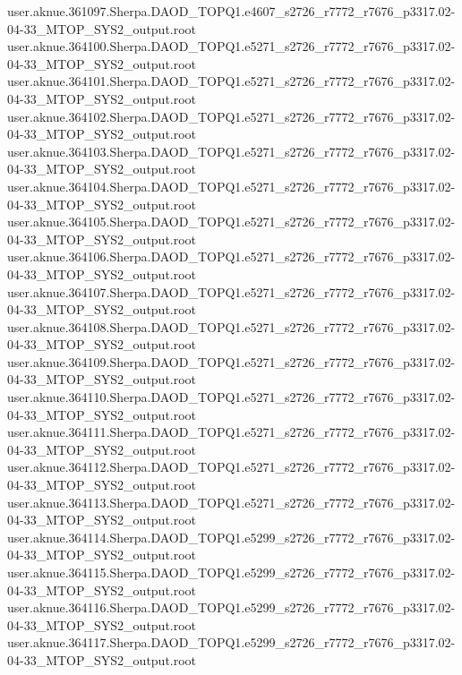 {user.aknue.361097.Sherpa.DAOD_TOPQ1.e4607_s2726_r7772_r7676_p3317.02-04-33_MTOP_SYS2_output.root\\
user.aknue.364100.Sherpa.DAOD_TOPQ1.e5271_s2726_r7772_r7676_p3317.02-04-33_MTOP_SYS2_output.root\\
user.aknue.364101.Sherpa.DAOD_TOPQ1.e5271_s2726_r7772_r7676_p3317.02-04-33_MTOP_SYS2_output.root\\
user.aknue.364102.Sherpa.DAOD_TOPQ1.e5271_s2726_r7772_r7676_p3317.02-04-33_MTOP_SYS2_output.root\\
user.aknue.364103.Sherpa.DAOD_TOPQ1.e5271_s2726_r7772_r7676_p3317.02-04-33_MTOP_SYS2_output.root\\
user.aknue.364104.Sherpa.DAOD_TOPQ1.e5271_s2726_r7772_r7676_p3317.02-04-33_MTOP_SYS2_output.root\\
user.aknue.364105.Sherpa.DAOD_TOPQ1.e5271_s2726_r7772_r7676_p3317.02-04-33_MTOP_SYS2_output.root\\
user.aknue.364106.Sherpa.DAOD_TOPQ1.e5271_s2726_r7772_r7676_p3317.02-04-33_MTOP_SYS2_output.root\\
user.aknue.364107.Sherpa.DAOD_TOPQ1.e5271_s2726_r7772_r7676_p3317.02-04-33_MTOP_SYS2_output.root\\
user.aknue.364108.Sherpa.DAOD_TOPQ1.e5271_s2726_r7772_r7676_p3317.02-04-33_MTOP_SYS2_output.root\\
user.aknue.364109.Sherpa.DAOD_TOPQ1.e5271_s2726_r7772_r7676_p3317.02-04-33_MTOP_SYS2_output.root\\
user.aknue.364110.Sherpa.DAOD_TOPQ1.e5271_s2726_r7772_r7676_p3317.02-04-33_MTOP_SYS2_output.root\\
user.aknue.364111.Sherpa.DAOD_TOPQ1.e5271_s2726_r7772_r7676_p3317.02-04-33_MTOP_SYS2_output.root\\
user.aknue.364112.Sherpa.DAOD_TOPQ1.e5271_s2726_r7772_r7676_p3317.02-04-33_MTOP_SYS2_output.root\\
user.aknue.364113.Sherpa.DAOD_TOPQ1.e5271_s2726_r7772_r7676_p3317.02-04-33_MTOP_SYS2_output.root\\
user.aknue.364114.Sherpa.DAOD_TOPQ1.e5299_s2726_r7772_r7676_p3317.02-04-33_MTOP_SYS2_output.root\\
user.aknue.364115.Sherpa.DAOD_TOPQ1.e5299_s2726_r7772_r7676_p3317.02-04-33_MTOP_SYS2_output.root\\
user.aknue.364116.Sherpa.DAOD_TOPQ1.e5299_s2726_r7772_r7676_p3317.02-04-33_MTOP_SYS2_output.root\\
user.aknue.364117.Sherpa.DAOD_TOPQ1.e5299_s2726_r7772_r7676_p3317.02-04-33_MTOP_SYS2_output.root\\
}
